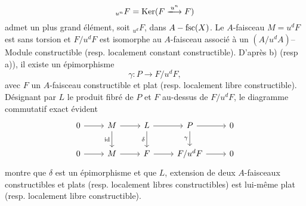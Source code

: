 \begin{itemize}
    $$
    _{u^{n}} F = \Ker(F \xlongrightarrow{u^n} F)
    $$
    admet un plus grand élément, soit $_{u^{d}} F$, dans $A-\operatorname{fsc}(X)$. Le $A$-faisceau $M = u^dF$ est sans torsion et $F/u^dF$ est isomorphe au $A$-faisceau associé   à un $(A/u^dA)$--Module constructible (resp. localement constant constructible). D'après b) (resp a)), il existe un épimorphisme
    $$
    \gamma: P \to F/u^dF,
    $$
    avec $F$ un $A$-faisceau constructible et plat (resp. localement libre constructible). Désignant par $L$ le produit fibré de $P$ et $F$ au-dessus de $F/u^dF$, le diagramme commutatif exact évident
    \[\begin{tikzcd}
	0 & M & L & P & 0 \\
	0 & M & F & {F/u^dF} & 0
	\arrow[from=1-1, to=1-2]
	\arrow[from=1-2, to=1-3]
	\arrow[from=1-3, to=1-4]
	\arrow[from=1-4, to=1-5]
	\arrow[from=2-4, to=2-5]
	\arrow[from=2-3, to=2-4]
	\arrow[from=2-2, to=2-3]
	\arrow[from=2-1, to=2-2]
	\arrow["\id"', from=1-2, to=2-2]
	\arrow["\delta"', from=1-3, to=2-3]
	\arrow["\gamma"', from=1-4, to=2-4]
    \end{tikzcd}\]
    montre que $\delta$ est un épimorphisme et que $L$, extension de deux $A$-faisceaux constructibles et plats (resp. localement libres constructibles) est lui-même plat (resp. localement libre constructible).
\end{itemize}









